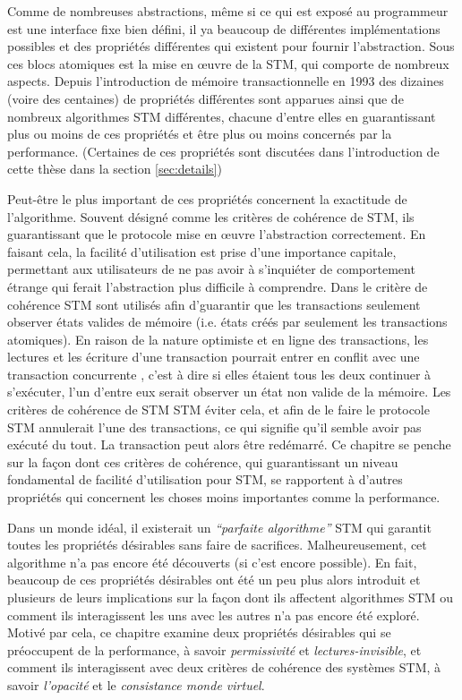 Comme de nombreuses abstractions, même si ce qui est exposé au programmeur est une interface fixe bien défini,
il ya beaucoup de différentes implémentations possibles et des propriétés différentes qui existent pour fournir l'abstraction.
Sous ces blocs atomiques est la mise en œuvre de la STM, qui comporte de nombreux aspects.
Depuis l'introduction de mémoire transactionnelle en 1993 \cite{HM93} des dizaines (voire des centaines) de propriétés différentes
sont apparues ainsi que de nombreux algorithmes STM différentes, chacune d'entre elles en guarantissant plus ou moins de ces propriétés et être plus ou moins concernés par la performance.
(Certaines de ces propriétés sont discutées dans l'introduction de cette thèse dans la section \ref{sec:details})


Peut-être le plus important de ces propriétés concernent la exactitude de l'algorithme.
Souvent désigné comme les critères de cohérence de STM, ils guarantissant que le protocole mise en œuvre l'abstraction correctement.
En faisant cela, la facilité d'utilisation est prise d'une importance capitale,
permettant aux utilisateurs de ne pas avoir à s'inquiéter de comportement étrange qui ferait l'abstraction plus difficile à comprendre.
Dans le critère de cohérence STM sont utilisés afin d'guarantir que les transactions seulement observer états
valides de mémoire (i.e. états créés par seulement les transactions atomiques).
En raison de la nature optimiste et en ligne des transactions, les lectures et les écriture d'une transaction pourrait entrer en conflit
avec une transaction concurrente , c'est à dire si elles étaient tous les deux continuer à s'exécuter, l'un d'entre eux serait observer un état non valide de la mémoire.
Les critères de cohérence de STM STM éviter cela, et afin de le faire le protocole STM annulerait l'une des transactions, ce qui signifie qu'il semble avoir pas exécuté du tout.
La transaction peut alors être redémarré.
Ce chapitre se penche sur la façon dont ces critères de cohérence, qui guarantissant un niveau fondamental de facilité d'utilisation pour STM,
se rapportent à d'autres propriétés qui concernent les choses moins importantes comme la performance.


Dans un monde idéal, il existerait un \emph{``parfaite algorithme''} STM qui garantit toutes les propriétés désirables sans faire de sacrifices.
Malheureusement, cet algorithme n'a pas encore été découverts (si c'est encore possible).
En fait, beaucoup de ces propriétés désirables ont été un peu plus alors introduit et plusieurs de leurs implications sur la façon
dont ils affectent algorithmes STM ou comment ils interagissent les uns avec les autres n'a pas encore été exploré.
Motivé par cela, ce chapitre examine deux propriétés désirables qui se préoccupent de la performance,
à savoir \emph{permissivité} et \emph{lectures-invisible}, et comment ils interagissent avec deux critères de cohérence des systèmes STM,
à savoir \emph{l'opacité} et le \emph{consistance monde virtuel}.



